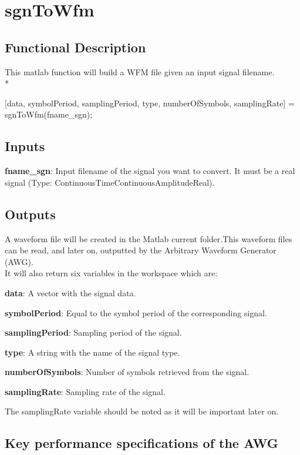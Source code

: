 \clearpage

\section{sgnToWfm}

\subsection*{Functional Description}
This matlab function will build a WFM file given an input signal filename. \\*

[data, symbolPeriod, samplingPeriod, type, numberOfSymbols, samplingRate] = sgnToWfm(fname\_sgn);

\subsection*{Inputs}
\textbf{fname\_sgn}: Input filename of the signal you want to convert. It must be a real signal (Type: ContinuousTimeContinuousAmplitudeReal). 

\subsection*{Outputs}
A waveform file will be created in the Matlab current folder.This waveform files can be read, and later on, outputted by the Arbitrary Waveform Generator (AWG). \\
It will also return six variables in the workspace which are:
\bigskip

\textbf{data}: A vector with the signal data.
\bigskip

\textbf{symbolPeriod}: Equal to the symbol period of the corresponding signal.
\bigskip

\textbf{samplingPeriod}: Sampling period of the signal.
\bigskip

\textbf{type}: A string with the name of the signal type.
\bigskip

\textbf{numberOfSymbols}: Number of symbols retrieved from the signal.
\bigskip

\textbf{samplingRate}: Sampling rate of the signal.
\bigskip

\noindent
The samplingRate variable  should be noted as it will be important later on.

\subsection*{Key performance specifications of the AWG}

